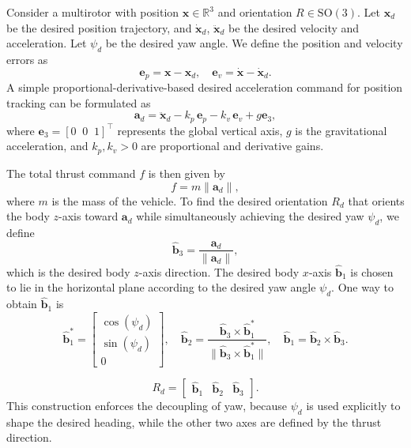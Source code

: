 \documentclass[12pt,twoside,letterpaper]{article}
\begin{document}
Consider a multirotor with position \(\mathbf{x} \in \mathbb{R}^3\) and orientation \(R \in \mathrm{SO}(3)\). Let \(\mathbf{x}_d\) be the desired position trajectory, and \(\dot{\mathbf{x}}_d\), \(\ddot{\mathbf{x}}_d\) be the desired velocity and acceleration. Let \(\psi_d\) be the desired yaw angle. We define the position and velocity errors as
\begin{equation}
\mathbf{e}_p = \mathbf{x} - \mathbf{x}_d, 
\quad
\mathbf{e}_v = \dot{\mathbf{x}} - \dot{\mathbf{x}}_d.
\end{equation}
A simple proportional-derivative-based desired acceleration command for position tracking can be formulated as
\begin{equation}
\mathbf{a}_d = \ddot{\mathbf{x}}_d 
- k_p\,\mathbf{e}_p 
- k_v\,\mathbf{e}_v 
+ g \mathbf{e}_3,
\end{equation}
where \(\mathbf{e}_3 = [0 \;\; 0 \;\; 1]^\top\) represents the global vertical axis, \(g\) is the gravitational acceleration, and \(k_p, k_v > 0\) are proportional and derivative gains.

The total thrust command \(f\) is then given by
\begin{equation}
f = m \|\mathbf{a}_d\|,
\end{equation}
where \(m\) is the mass of the vehicle. To find the desired orientation \(R_d\) that orients the body \(z\)-axis toward \(\mathbf{a}_d\) while simultaneously achieving the desired yaw \(\psi_d\), we define
\begin{equation}
\hat{\mathbf{b}}_3 = \frac{\mathbf{a}_d}{\|\mathbf{a}_d\|}, 
\end{equation}
which is the desired body \(z\)-axis direction. The desired body \(x\)-axis \(\hat{\mathbf{b}}_1\) is chosen to lie in the horizontal plane according to the desired yaw angle \(\psi_d\). One way to obtain \(\hat{\mathbf{b}}_1\) is
\begin{equation}
\hat{\mathbf{b}}_{1}^{*} = 
\begin{bmatrix}
\cos(\psi_{d}) \\
\sin(\psi_{d}) \\
0
\end{bmatrix},
\quad
\hat{\mathbf{b}}_{2} = \frac{\hat{\mathbf{b}}_{3} \times \hat{\mathbf{b}}_{1}^{*}}{\|\hat{\mathbf{b}}_{3} \times \hat{\mathbf{b}}_{1}^{*}\|},
\quad
\hat{\mathbf{b}}_{1} = \hat{\mathbf{b}}_{2} \times \hat{\mathbf{b}}_{3}.
\end{equation}

\begin{equation}
R_{d} = 
\begin{bmatrix}
\hat{\mathbf{b}}_{1} & \hat{\mathbf{b}}_{2} & \hat{\mathbf{b}}_{3}
\end{bmatrix}.
\end{equation}
This construction enforces the decoupling of yaw, because \(\psi_d\) is used explicitly to shape the desired heading, while the other two axes are defined by the thrust direction.
\end{document}
